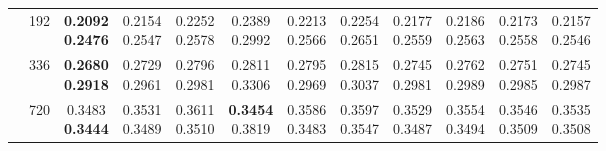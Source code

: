 \begin{longtable}{@{}llcccccccccc@{}}
 & 192 & \shortstack{\colorbox[gray]{0.82}{\textbf{0.2092}}\\\colorbox[gray]{0.82}{\textbf{0.2476}}} & \shortstack{\colorbox[gray]{0.92}{0.2154}\\0.2547} & \shortstack{0.2252\\0.2578} & \shortstack{0.2389\\0.2992} & \shortstack{0.2213\\0.2566} & \shortstack{0.2254\\0.2651} & \shortstack{0.2177\\0.2559} & \shortstack{0.2186\\0.2563} & \shortstack{0.2173\\0.2558} & \shortstack{0.2157\\\colorbox[gray]{0.92}{0.2546}} \\ \cline{2-12}

 & 336 & \shortstack{\colorbox[gray]{0.82}{\textbf{0.2680}}\\\colorbox[gray]{0.82}{\textbf{0.2918}}} & \shortstack{\colorbox[gray]{0.92}{0.2729}\\\colorbox[gray]{0.92}{0.2961}} & \shortstack{0.2796\\0.2981} & \shortstack{0.2811\\0.3306} & \shortstack{0.2795\\0.2969} & \shortstack{0.2815\\0.3037} & \shortstack{0.2745\\0.2981} & \shortstack{0.2762\\0.2989} & \shortstack{0.2751\\0.2985} & \shortstack{0.2745\\0.2987} \\ \cline{2-12}

 & 720 & \shortstack{\colorbox[gray]{0.92}{0.3483}\\\colorbox[gray]{0.82}{\textbf{0.3444}}} & \shortstack{0.3531\\0.3489} & \shortstack{0.3611\\0.3510} & \shortstack{\colorbox[gray]{0.82}{\textbf{0.3454}}\\0.3819} & \shortstack{0.3586\\\colorbox[gray]{0.92}{0.3483}} & \shortstack{0.3597\\0.3547} & \shortstack{0.3529\\0.3487} & \shortstack{0.3554\\0.3494} & \shortstack{0.3546\\0.3509} & \shortstack{0.3535\\0.3508} \\ \hline


\end{longtable}
